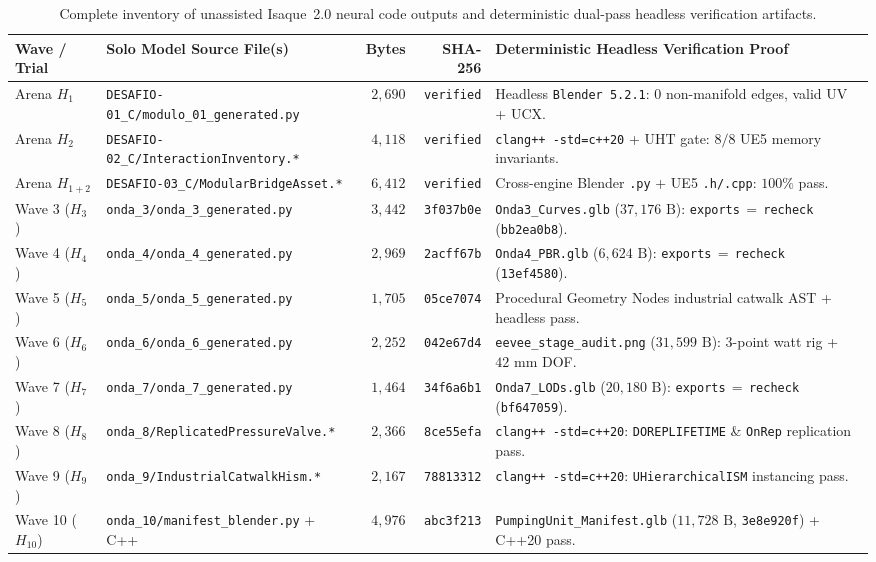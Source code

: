 \documentclass[10pt,a4paper]{article}
\begin{document}
\begin{table}[!htbp]
\centering
\caption{Complete inventory of unassisted Isaque~2.0 neural code outputs and deterministic dual-pass headless verification artifacts.}
\label{tab:solo}
\footnotesize
\begin{tabularx}{\linewidth}{@{}llrrY@{}}
\toprule
\textbf{Wave / Trial} & \textbf{Solo Model Source File(s)} & \textbf{Bytes} & \textbf{SHA-256} & \textbf{Deterministic Headless Verification Proof} \\
\midrule
Arena $H_1$ & \texttt{DESAFIO-01\_\allowbreak{}C/modulo\_\allowbreak{}01\_\allowbreak{}generated.py} & $2,690$ & \texttt{verified} & Headless \texttt{Blender 5.2.1}: $0$ non-manifold edges, valid UV + UCX. \\
Arena $H_2$ & \texttt{DESAFIO-02\_\allowbreak{}C/InteractionInventory.*} & $4,118$ & \texttt{verified} & \texttt{clang++ -std=c++20} + UHT gate: $8/8$ UE5 memory invariants. \\
Arena $H_{1+2}$ & \texttt{DESAFIO-03\_\allowbreak{}C/ModularBridgeAsset.*} & $6,412$ & \texttt{verified} & Cross-engine Blender \texttt{.py} + UE5 \texttt{.h/.cpp}: $100\%$ pass. \\
Wave 3 ($H_3$) & \texttt{onda\_3/onda\_\allowbreak{}3\_\allowbreak{}generated.py} & $3,442$ & \texttt{3f037b0e} & \texttt{Onda3\_Curves.glb} ($37,176\text{ B}$): \texttt{exports}$\,=\,$\texttt{recheck} (\texttt{bb2ea0b8}). \\
Wave 4 ($H_4$) & \texttt{onda\_4/onda\_\allowbreak{}4\_\allowbreak{}generated.py} & $2,969$ & \texttt{2acff67b} & \texttt{Onda4\_PBR.glb} ($6,624\text{ B}$): \texttt{exports}$\,=\,$\texttt{recheck} (\texttt{13ef4580}). \\
Wave 5 ($H_5$) & \texttt{onda\_5/onda\_\allowbreak{}5\_\allowbreak{}generated.py} & $1,705$ & \texttt{05ce7074} & Procedural Geometry Nodes industrial catwalk AST + headless pass. \\
Wave 6 ($H_6$) & \texttt{onda\_6/onda\_\allowbreak{}6\_\allowbreak{}generated.py} & $2,252$ & \texttt{042e67d4} & \texttt{eevee\_stage\_audit.png} ($31,599\text{ B}$): 3-point watt rig + $42\text{ mm}$ DOF. \\
Wave 7 ($H_7$) & \texttt{onda\_7/onda\_\allowbreak{}7\_\allowbreak{}generated.py} & $1,464$ & \texttt{34f6a6b1} & \texttt{Onda7\_LODs.glb} ($20,180\text{ B}$): \texttt{exports}$\,=\,$\texttt{recheck} (\texttt{bf647059}). \\
Wave 8 ($H_8$) & \texttt{onda\_8/ReplicatedPressureValve.*} & $2,366$ & \texttt{8ce55efa} & \texttt{clang++ -std=c++20}: \texttt{DOREPLIFETIME} \& \texttt{OnRep} replication pass. \\
Wave 9 ($H_9$) & \texttt{onda\_9/IndustrialCatwalkHism.*} & $2,167$ & \texttt{78813312} & \texttt{clang++ -std=c++20}: \texttt{UHierarchicalISM} instancing pass. \\
Wave 10 ($H_{10}$) & \texttt{onda\_10/manifest\_\allowbreak{}blender.py} + C++ & $4,976$ & \texttt{abc3f213} & \texttt{PumpingUnit\_Manifest.glb} ($11,728\text{ B}$, \texttt{3e8e920f}) + C++20 pass. \\
\bottomrule
\end{tabularx}
\end{table}
\end{document}
